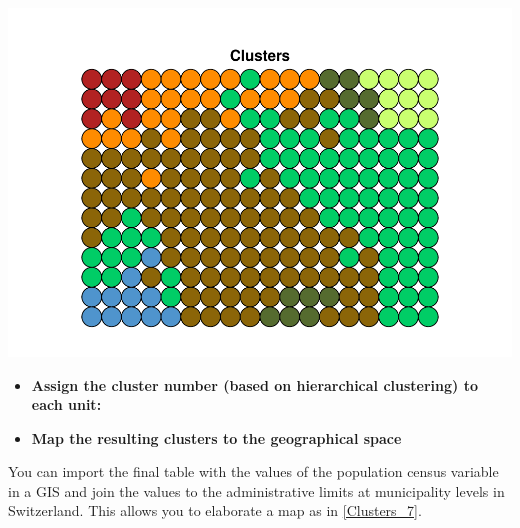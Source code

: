 \documentclass[
]{book}
\newenvironment{Shaded}{\begin{snugshade}}{\end{snugshade}}
\newcommand{\AttributeTok}[1]{\textcolor[rgb]{0.13,0.29,0.53}{#1}}
\newcommand{\CommentTok}[1]{\textcolor[rgb]{0.56,0.35,0.01}{\textit{#1}}}
\newcommand{\FunctionTok}[1]{\textcolor[rgb]{0.13,0.29,0.53}{\textbf{#1}}}
\newcommand{\NormalTok}[1]{#1}
\newcommand{\OtherTok}[1]{\textcolor[rgb]{0.56,0.35,0.01}{#1}}
\newcommand{\SpecialCharTok}[1]{\textcolor[rgb]{0.81,0.36,0.00}{\textbf{#1}}}
\newcommand{\StringTok}[1]{\textcolor[rgb]{0.31,0.60,0.02}{#1}}
\providecommand{\tightlist}{%
  \setlength{\itemsep}{0pt}\setlength{\parskip}{0pt}}
\begin{document}
\includegraphics{05-SOM_files/figure-latex/clustermap_maxmin-1.pdf}

\begin{itemize}
\tightlist
\item
  \textbf{Assign the cluster number (based on hierarchical clustering) to each unit:}
\end{itemize}

\begin{Shaded}
\end{Shaded}

\begin{itemize}
\tightlist
\item
  \textbf{Map the resulting clusters to the geographical space}
\end{itemize}

You can import the final table with the values of the population census variable in a GIS and join the values to the administrative limits at municipality levels in Switzerland.
This allows you to elaborate a map as in \autoref{Clusters_7}.
\end{document}
